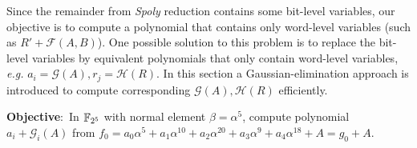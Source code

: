 Since the remainder from \emph{Spoly} reduction contains some bit-level variables, our objective is to compute
a polynomial that contains only word-level variables (such as $R'+\mathcal{F}(A,B)$). One possible solution to
this problem is to replace the bit-level variables by equivalent polynomials that only contain word-level
variables, {\it e.g.} $a_i = \mathcal{G}(A), r_j = \mathcal{H}(R)$. In this section a Gaussian-elimination
approach is introduced to compute corresponding $\mathcal{G}(A),\mathcal{H}(R)$ efficiently.

\begin{Example}
\label{ex:BLVS}
{\bf Objective}:\ In ${\mathbb{F}}_{2^5}$ with normal element $\beta = \alpha^5$, compute polynomial 
$a_i + \mathcal{G}_i(A)$ from $f_0 = a_0\alpha^5+a_1\alpha^{10}+a_2\alpha^{20}+a_3\alpha^9+a_4\alpha^{18}+A
 = g_0 + A$.


\end{Example}
